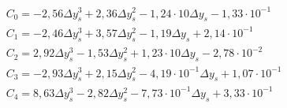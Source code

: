 \begin{eqnarray}
&C_0 =-2,56\Delta y_s^{3}+2,36\Delta y_s^{2}-1,24\cdot 10\Delta y_s-1,33\cdot 10^{-1} \\     
&C_1 =-2,46\Delta y_s^{3}+3,57\Delta y_s^{2}-1,19\Delta y_s+2,14\cdot 10^{-1} \\             
&C_2 =2,92\Delta y_s^{3}-1,53\Delta y_s^{2}+1,23\cdot 10\Delta y_s-2,78\cdot 10^{-2} \\      
&C_3 =-2,93\Delta y_s^{3}+2,15\Delta y_s^{2}-4,19\cdot 10^{-1}\Delta y_s+1,07\cdot 10^{-1} \\
&C_4 =8,63\Delta y_s^{3}-2,82\Delta y_s^{2}-7,73\cdot 10^{-1}\Delta y_s+3,33\cdot 10^{-1}          
\end{eqnarray}
%
%
%
%
%
%
%
